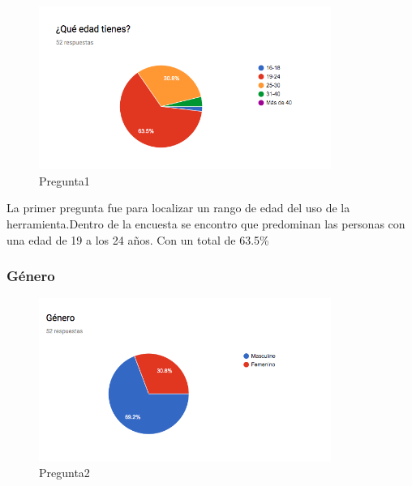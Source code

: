 \begin{figure}[htbp!]
	\begin{center}
		\includegraphics[width=0.85\textwidth]{DisenoEstructura/imagenes/Pregunta1}
		\caption{Pregunta1}
		\label{DE/FO/Pregunta1}
	\end{center}
\end{figure}

La primer pregunta fue para localizar un rango de edad del uso de la herramienta.Dentro de la encuesta se encontro que predominan las personas con una edad de 19 a los 24 años. Con un total de 63.5\% \\


\subsubsection{Género}

\begin{figure}[htbp!]
	\begin{center}
		\includegraphics[width=0.85\textwidth]{DisenoEstructura/imagenes/Pregunta2}
		\caption{Pregunta2}
		\label{DE/FO/Pregunta2}
	\end{center}
\end{figure}

